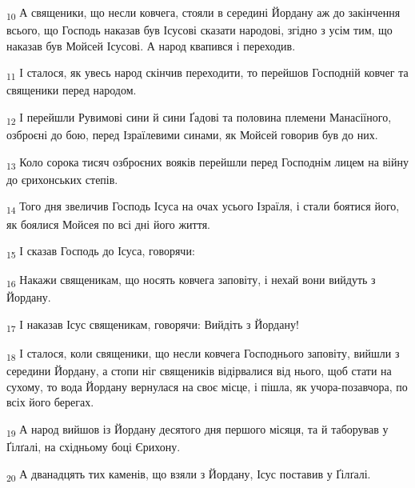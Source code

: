 \begin{tcolorbox}
\textsubscript{10} А священики, що несли ковчега, стояли в середині Йордану аж до закінчення всього, що Господь наказав був Ісусові сказати народові, згідно з усім тим, що наказав був Мойсей Ісусові. А народ квапився і переходив.
\end{tcolorbox}
\begin{tcolorbox}
\textsubscript{11} І сталося, як увесь народ скінчив переходити, то перейшов Господній ковчег та священики перед народом.
\end{tcolorbox}
\begin{tcolorbox}
\textsubscript{12} І перейшли Рувимові сини й сини Ґадові та половина племени Манасіїного, озброєні до бою, перед Ізраїлевими синами, як Мойсей говорив був до них.
\end{tcolorbox}
\begin{tcolorbox}
\textsubscript{13} Коло сорока тисяч озброєних вояків перейшли перед Господнім лицем на війну до єрихонських степів.
\end{tcolorbox}
\begin{tcolorbox}
\textsubscript{14} Того дня звеличив Господь Ісуса на очах усього Ізраїля, і стали боятися його, як боялися Мойсея по всі дні його життя.
\end{tcolorbox}
\begin{tcolorbox}
\textsubscript{15} І сказав Господь до Ісуса, говорячи:
\end{tcolorbox}
\begin{tcolorbox}
\textsubscript{16} Накажи священикам, що носять ковчега заповіту, і нехай вони вийдуть з Йордану.
\end{tcolorbox}
\begin{tcolorbox}
\textsubscript{17} І наказав Ісус священикам, говорячи: Вийдіть з Йордану!
\end{tcolorbox}
\begin{tcolorbox}
\textsubscript{18} І сталося, коли священики, що несли ковчега Господнього заповіту, вийшли з середини Йордану, а стопи ніг священиків відірвалися від нього, щоб стати на сухому, то вода Йордану вернулася на своє місце, і пішла, як учора-позавчора, по всіх його берегах.
\end{tcolorbox}
\begin{tcolorbox}
\textsubscript{19} А народ вийшов із Йордану десятого дня першого місяця, та й таборував у Ґілґалі, на східньому боці Єрихону.
\end{tcolorbox}
\begin{tcolorbox}
\textsubscript{20} А дванадцять тих каменів, що взяли з Йордану, Ісус поставив у Ґілґалі.
\end{tcolorbox}

